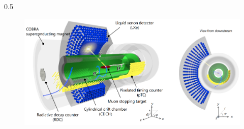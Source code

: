 \documentclass{beamer}
\begin{document}
\begin{frame}
\begin{columns}
\begin{column}{0.5\framewidth}
\begin{figure}[!h]
            \end{figure}
            \begin{figure}[!h]
                \centering
                \includegraphics[width =\columnwidth]{figures/png/Screenshot_20240307_140116.png}
                \end{figure}
    \end{column}

\end{columns}
    \end{frame}
  
\end{document}

